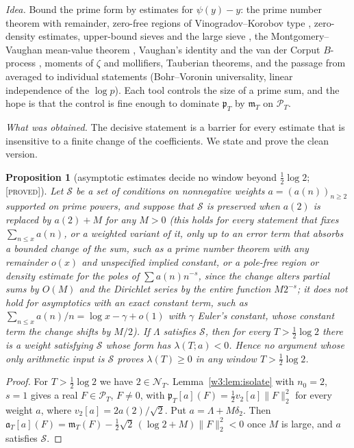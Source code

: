 \documentclass[11pt]{amsart}
\newtheorem{proposition}[theorem]{Proposition}
\theoremstyle{definition}
\theoremstyle{remark}
\numberwithin{equation}{section}
\newcommand{\PT}{\mathcal{P}_T}                        %
\newcommand{\NT}{\mathcal{N}_T}                        %
\newcommand{\mT}{\mathfrak{m}_T}                       %
\newcommand{\pT}{\mathfrak{p}_T}                       %
\newcommand{\aT}{\mathfrak{a}_T}                       %
\newcommand{\lam}{\lambda(T)}                          %
\newcommand{\stag}[1]{\textsc{[#1]}}
\newcommand{\PROVED}{\stag{proved}}
\newcommand{\entry}[1]{\par\smallskip\noindent\textit{#1.}\enspace}
\begin{document}
\entry{Idea} Bound the prime form by estimates for $\psi(y)-y$: the prime number theorem with remainder, zero-free
regions of Vinogradov--Korobov type \cite{Ford2002}, zero-density estimates, upper-bound sieves and the large
sieve \cite{MontgomeryVaughan1973}, the Montgomery--Vaughan mean-value theorem \cite{MontgomeryVaughan1974},
Vaughan's identity and the van der Corput $B$-process \cite{Vaughan1977}, moments of $\zeta$ and mollifiers,
Tauberian theorems, and the passage from averaged to individual statements (Bohr--Voronin universality, linear
independence of the $\log p$). Each tool controls the size of a prime sum, and the hope is that the control is
fine enough to dominate $\pT$ by $\mT$ on $\PT$.

\entry{What was obtained} The decisive statement is a barrier for every estimate that is insensitive to a
finite change of the coefficients. We state and prove the clean version.

\begin{proposition}[asymptotic estimates decide no window beyond $\frac12\log2$; \PROVED]\label{w7:prop:finmod}
Let $\mathcal S$ be a set of conditions on nonnegative weights $a=(a(n))_{n\ge2}$ supported on prime powers, and
suppose that $\mathcal S$ is preserved when $a(2)$ is replaced by $a(2)+M$ for any $M>0$ (this holds for every
statement that fixes $\sum_{n\le x}a(n)$, or a weighted variant of it, only up to an error term that absorbs a
bounded change of the sum, such as a prime number theorem with any remainder $o(x)$ and unspecified implied
constant, or a pole-free region or density estimate for the poles of $\sum a(n)n^{-s}$, since the
change alters partial sums by $O(M)$ and the Dirichlet series by the entire function $M2^{-s}$; it does not
hold for asymptotics with an exact constant term, such as $\sum_{n\le x}a(n)/n=\log x-\gamma+o(1)$ with
$\gamma$ Euler's constant, whose constant term the change shifts by $M/2$). If $\Lambda$ satisfies $\mathcal S$, then for every $T>\frac12\log2$ there is
a weight satisfying $\mathcal S$ whose form has $\lambda(T;a)<0$. Hence no argument whose only arithmetic input
is $\mathcal S$ proves $\lam\ge0$ in any window $T>\frac12\log2$.
\end{proposition}

\begin{proof}
For $T>\frac12\log2$ we have $2\in\NT$. Lemma~\ref{w3:lem:isolate} with $n_0=2$, $s=1$ gives a real
$F\in\PT$, $F\neq0$, with $\pT[a](F)=\frac12 v_2[a]\|F\|_2^2$ for every weight $a$, where
$v_2[a]=2a(2)/\sqrt2$. Put $a=\Lambda+M\delta_2$. Then
$\aT[a](F)=\mT(F)-\frac12\sqrt2\,(\log2+M)\|F\|_2^2<0$ once $M$ is large, and $a$ satisfies $\mathcal S$.
\end{proof}
\end{document}
